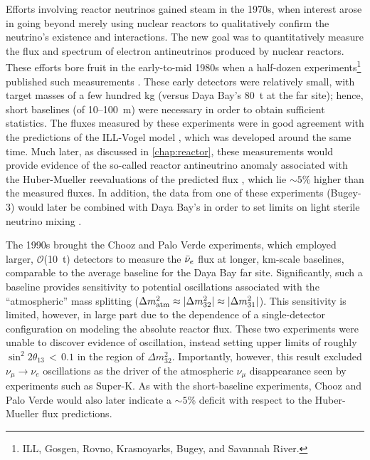 \documentclass[../thesis.tex]{subfiles}
\begin{document}
Efforts involving reactor neutrinos gained steam in the 1970s, when interest arose in going beyond merely using nuclear reactors to qualitatively confirm the neutrino's existence and interactions. The new goal was to quantitatively measure the flux and spectrum of electron antineutrinos produced by nuclear reactors. These efforts bore fruit in the early-to-mid 1980s when a half-dozen experiments\footnote{ILL, Gosgen, Rovno, Krasnoyarks, Bugey, and Savannah River.} published such measurements \cite{PhysRevD.24.1097,Zacek:1986cu,Afonin:1985rw,Aleshin_2008,Abbes:1995nc,Sobel:1982gf}. These early detectors were relatively small, with target masses of a few hundred kg (versus Daya Bay's 80~t at the far site); hence, short baselines (of 10--100~m) were necessary in order to obtain sufficient statistics. The fluxes measured by these experiments were in good agreement with the predictions of the ILL-Vogel model \cite{SCHRECKENBACH1985325,VONFEILITZSCH1982162,HAHN1989365,PhysRevC.24.1543}, which was developed around the same time. Much later, as discussed in \autoref{chap:reactor}, these measurements would provide evidence of the so-called reactor antineutrino anomaly \cite{PhysRevD.83.073006} associated with the Huber-Mueller reevaluations of the predicted flux \cite{PhysRevC.84.024617,PhysRevC.83.054615}, which lie $\sim5$\% higher than the measured fluxes. In addition, the data from one of these experiments (Bugey-3) would later be combined with Daya Bay's in order to set limits on light sterile neutrino mixing \cite{PhysRevLett.117.151801}.

The 1990s brought the Chooz \cite{Apollonio_2003} and Palo Verde \cite{PhysRevD.64.112001} experiments, which employed larger, $\mathcal{O}$(10~t) detectors to measure the $\bar\nu_e$ flux at longer, km-scale baselines, comparable to the average baseline for the Daya Bay far site. Significantly, such a baseline provides sensitivity to potential oscillations associated with the ``atmospheric'' mass splitting ($\Delta m^2_{\mathrm{atm}} \approx \lvert \Delta m^2_{32}\rvert \approx \lvert \Delta m^2_{31}\rvert$). This sensitivity is limited, however, in large part due to the dependence of a single-detector configuration on modeling the absolute reactor flux. These two experiments were unable to discover evidence of oscillation, instead setting upper limits of roughly $\sin^2 2\theta_{13}\,<\,0.1$ in the region of $\Delta m^2_{32}$. Importantly, however, this result excluded $\nu_\mu \rightarrow \nu_e$ oscillations as the driver of the atmospheric $\nu_\mu$ disappearance seen by experiments such as Super-K.
As with the short-baseline experiments, Chooz and Palo Verde would also later indicate a $\sim5$\% deficit with respect to the Huber-Mueller flux predictions.
\end{document}
